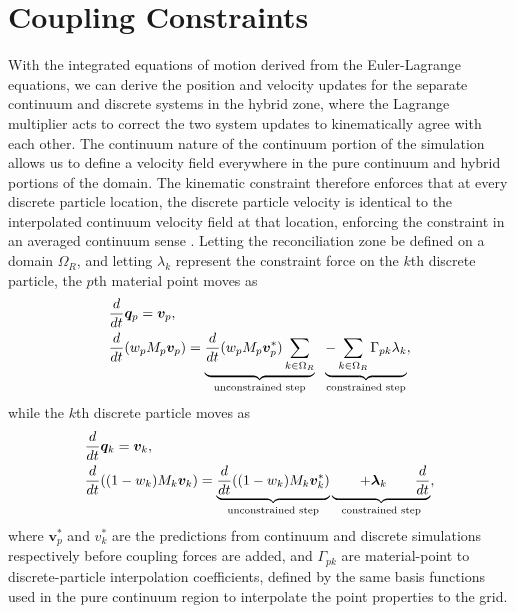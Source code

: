 \section{Coupling Constraints}
With the integrated equations of motion derived from the Euler-Lagrange equations, we can derive the position and velocity updates for the separate continuum and discrete systems in the hybrid zone, where the Lagrange multiplier acts to correct the two system updates to kinematically agree with each other. The continuum nature of the continuum portion of the simulation allows us to define a velocity field everywhere in the pure continuum and hybrid portions of the domain. The kinematic constraint therefore enforces that at every discrete particle location, the discrete particle velocity is identical to the interpolated continuum velocity field at that location, enforcing the constraint in an averaged continuum sense \cite{Bergou:2007:TTDTS}. Letting the reconciliation zone be defined on a domain $\Omega_R$, and letting $\lambda_k$ represent the constraint force on the $k$th discrete particle, the $p$th
material point moves as
\begin{align}
\begin{aligned}
&\frac{d}{dt} \boldsymbol{q}_p = \bm{v}_p , \\
&\frac{d}{dt} (w_p M_p \bm{v}_p) = \underbrace{\frac{d}{dt} (w_p M_p \bm{v}_p^*) \sum_{k \in \Omega_R} }_{\textrm{\scriptsize unconstrained step}} \hspace{6pt} \underbrace{- \sum_{k \in \Omega_R} \Gamma_{pk}\lambda_k}_{\textrm{\scriptsize constrained step}} ,
\end{aligned}
\end{align}
while the $k$th discrete particle moves as
\begin{align}
\begin{aligned}
&\frac{d}{dt} \boldsymbol{q}_k = \bm{v}_k , \\
&\frac{d}{dt} ((1-w_k) M_k \bm{v}_k) = \underbrace{\frac{d}{dt} ((1-w_k) M_k \bm{v}_k^*)}_{\textrm{\scriptsize unconstrained step}} \underbrace{\hspace{20pt} + \boldsymbol{\lambda}_k  \hspace{20pt} {\frac{d}{dt}}}_{\textrm{\scriptsize constrained step}} ,
\end{aligned}
\end{align}
where $\bm{v}_p^*$ and $v_k^*$ are the predictions from continuum and discrete simulations respectively before coupling forces are added, and
$\Gamma_{pk}$ are material-point to discrete-particle interpolation coefficients, defined by the same basis functions used in the pure continuum region to interpolate the point properties to the grid.

